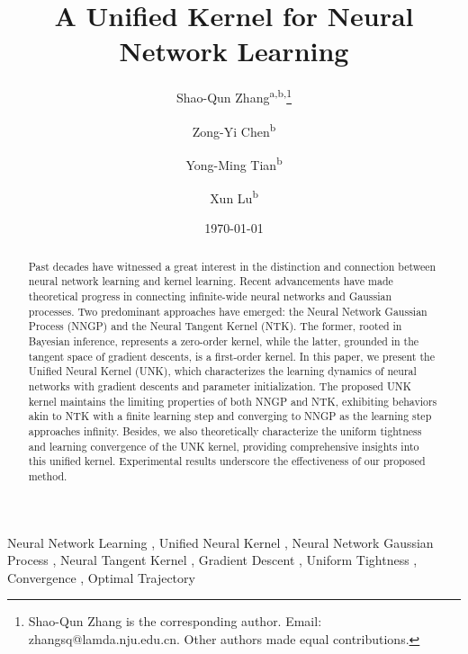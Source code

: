 \documentclass[review,10pt]{JMtemplate}
\begin{document}
\begin{frontmatter}
\title{A Unified Kernel for Neural Network Learning}

\author{Shao-Qun Zhang\textsuperscript{a,b,}\footnote{Shao-Qun Zhang is the corresponding author. Email: zhangsq@lamda.nju.edu.cn. Other authors made equal contributions.}}
\author{Zong-Yi Chen\textsuperscript{b}}
\author{Yong-Ming Tian\textsuperscript{b}}
\author{Xun Lu\textsuperscript{b}}
\address{
\textsuperscript{a} National Key Laboratory for Novel Software Technology, Nanjing University, Nanjing 210023, China \\
\textsuperscript{b} School of Intelligent Science and Technology, Nanjing University, Suzhou 215163, China
}
\date{\today}


\begin{abstract}
Past decades have witnessed a great interest in the distinction and connection between neural network learning and kernel learning. Recent advancements have made theoretical progress in connecting infinite-wide neural networks and Gaussian processes. Two predominant approaches have emerged: the Neural Network Gaussian Process (NNGP) and the Neural Tangent Kernel (NTK). The former, rooted in Bayesian inference, represents a zero-order kernel, while the latter, grounded in the tangent space of gradient descents, is a first-order kernel. In this paper, we present the Unified Neural Kernel (UNK), which characterizes the learning dynamics of neural networks with gradient descents and parameter initialization. The proposed UNK kernel maintains the limiting properties of both NNGP and NTK, exhibiting behaviors akin to NTK with a finite learning step and converging to NNGP as the learning step approaches infinity. Besides, we also theoretically characterize the uniform tightness and learning convergence of the UNK kernel, providing comprehensive insights into this unified kernel. Experimental results underscore the effectiveness of our proposed method. \vspace{0.5cm}
\end{abstract}


\begin{keyword}
Neural Network Learning \sep
Unified Neural Kernel \sep
Neural Network Gaussian Process \sep
Neural Tangent Kernel \sep
Gradient Descent \sep
Uniform Tightness \sep
Convergence \sep
Optimal Trajectory
\end{keyword}


\end{frontmatter}
\end{document}
